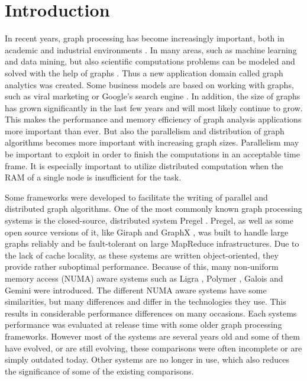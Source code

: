 \section{Introduction}
In recent years, graph processing has become increasingly important, both in academic and industrial environments \cite{Gemini}.
In many areas, such as machine learning and data mining, but also scientific computations problems can be modeled and solved with the help of graphs \cite{Polymer}.
Thus a new application domain called graph analytics was created.
Some business models are based on working with graphs, such as viral marketing \cite{viralMarketing} or Google's search engine \cite{pagerank}.
In addition, the size of graphs has grown significantly in the last few years and will most likely continue to grow.
This makes the performance and memory efficiency of graph analysis applications more important than ever.
But also the parallelism and distribution of graph algorithms becomes more important with increasing graph sizes.
Parallelism may be important to exploit in order to finish the computations in an acceptable time frame.
It is especially important to utilize distributed computation when the RAM of a single node is insufficient for the task.

Some frameworks were developed to facilitate the writing of parallel and distributed graph algorithms.
One of the most commonly known graph processing systems is the closed-source, distributed system Pregel \cite{pregel}.
Pregel, as well as some open source versions of it, like Giraph \cite{Giraph} and GraphX \cite{graphx}, was built to handle large graphs reliably and be fault-tolerant on large MapReduce infrastructures.
Due to the lack of cache locality, as these systems are written object-oriented, they provide rather suboptimal performance.
Because of this, many non-uniform memory access (NUMA) aware systems such as Ligra \cite{Ligra}, Polymer \cite{Polymer}, Galois \cite{Galois} and Gemini \cite{Gemini} were introduced.
The different NUMA aware systems have some similarities, but many differences and differ in the technologies they use.
This results in considerable performance differences on many occasions.
Each systems performance was evaluated at release time with some older graph processing frameworks.
However most of the systems are several years old and some of them have evolved, or are still evolving, these comparisons were often incomplete or are simply outdated today.
Other systems are no longer in use, which also reduces the significance of some of the existing comparisons.

